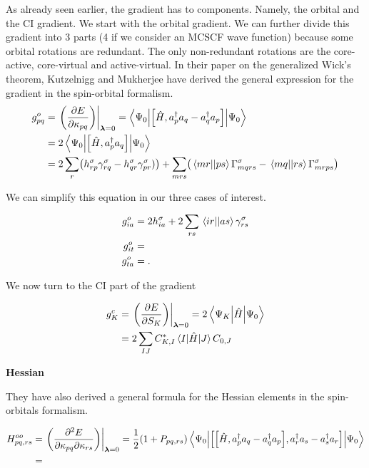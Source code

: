 \documentclass[11pt,a4paper]{article}
\newcommand{\hH}{\Hat{H}} %
\newcommand{\cre}[1]{a_{#1}^\dagger} %
\newcommand{\ani}[1]{a_{#1}} %
\newcommand{\com}[2]{\mleft[#1,#2 \mright]}
\begin{document}
As already seen earlier, the gradient has to components. Namely, the orbital and the CI gradient.
We start with the orbital gradient. We can further divide this gradient into 3 parts (4 if we consider an MCSCF wave function) because some orbital rotations are redundant.
The only non-redundant rotations are the core-active, core-virtual and active-virtual.
In their paper on the generalized Wick's theorem, Kutzelnigg and Mukherjee have derived the general expression for the gradient in the spin-orbital formalism.
\begin{align}
  \label{eq:MCSCF_SO_Orb_Gradient}
  g^o_{pq} &= \evalat*{\mleft(\pdv{E}{\kappa_{pq}}\mright)}{\bm{\lambda}=0} = \mel**{\Psi_0}{\com{\hH}{\cre{p}\ani{q} - \cre{q}\ani{p}}}{\Psi_0} \\
           &= 2\mel**{\Psi_0}{\com{\hH}{\cre{p}\ani{q}}}{\Psi_0} \notag \\
  &= 2 \sum_r\mleft(h_{rp}^{\sigma}\gamma_{rq}^{\sigma}-h_{qr}^{\sigma}\gamma_{pr}^{\sigma})\mright) + \sum_{mrs}\mleft(\mel{mr}{}{ps}\Gamma_{mqrs}^\sigma - \mel{mq}{}{rs}\Gamma_{mrps}^\sigma \mright) 
\end{align}

We can simplify this equation in our three cases of interest.

\begin{subequations}
  \label{eq:MCSCF_SO_Orb_Gradient}
  \begin{align}
    g^o_{ia} &= 2h_{ia}^\sigma + 2\sum_{rs}\mel{ir}{}{as}\gamma_{rs}^\sigma\\
    g^o_{it} &= \\
    g^o_{ta} &= .
  \end{align}
\end{subequations}

We now turn to the CI part of the gradient

\begin{align}
  \label{eq:MCSCF_CI_Gradient}
  g^c_{K} &= \evalat*{\mleft(\pdv{E}{S_{K}}\mright)}{\bm{\lambda}=0} = 2\mel**{\Psi_K}{\hH}{\Psi_0} \\
  &= 2\sum_{IJ}C_{K,I}^*\mel{I}{\hH}{J}C_{0,J} \notag
\end{align}

\noindent\textbf{Hessian}

They have also derived a general formula for the Hessian elements in the spin-orbitals formalism.

\begin{align}
  \label{eq:MCSCF_SO_OrbOrb_Hessian}
  H^{oo}_{pq,rs} &= \evalat*{\mleft(\pdv{E}{\kappa_{pq}}{\kappa_{rs}}\mright)}{\bm{\lambda}=0} = \frac{1}{2}(1+P_{pq,rs})\mel**{\Psi_0}{\com{\com{\hH}{\cre{p}\ani{q} - \cre{q}\ani{p}}}{\cre{r}\ani{s} - \cre{s}\ani{r}}}{\Psi_0} \\
  &= \notag
\end{align}
\end{document}

